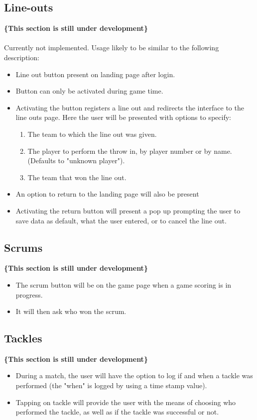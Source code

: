 \documentclass[hidelinks,a4paper,12pt]{article}
\begin{document}
	\subsection{Line-outs}
	{\bfseries\{This section is still under development\}}\\ \\
	Currently not implemented. Usage likely to be similar to the following description:
	\begin{itemize}
		\item Line out button present on landing page after login.
		\item Button can only be activated during game time.
		\item Activating the button registers a line out and redirects the interface to the line outs page. Here the user will be presented with options to specify:
			\begin{enumerate}
				\item The team to which the line out was given.
				\item The player to perform the throw in, by player number or by name. (Defaults to "unknown player").
				\item The team that won the line out.
			\end{enumerate}
		\item An option to return to the landing page will also be present
		\item Activating the return button will present a pop up prompting the user to save data as default, what the user entered, or to cancel the line out.
	\end{itemize}

	\subsection{Scrums}
	{\bfseries\{This section is still under development\}}
		\begin{itemize}
			\item The scrum button will be on the game page when a game scoring is in progress.
			\item It will then ask who won the scrum.
		\end{itemize}
		
	\subsection{Tackles}
	{\bfseries\{This section is still under development\}}
		\begin{itemize}
			\item During a match, the user will have the option to log if and when a tackle was performed (the "when" is logged by using a time stamp value).
			\item Tapping on tackle will provide the user with the means of choosing who performed the tackle, as well as if the tackle was successful or not.
		\end{itemize}
\end{document}
